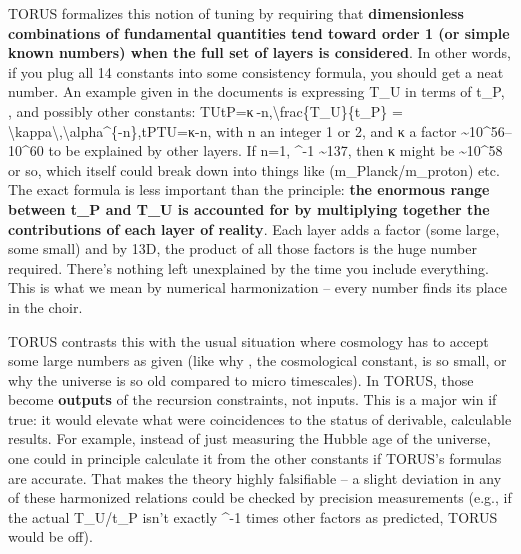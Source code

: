 \documentclass[
]{article}
\begin{document}
TORUS formalizes this notion of tuning by requiring that
\textbf{dimensionless combinations of fundamental quantities tend toward
order 1 (or simple known numbers) when the full set of layers is
considered}\hspace{0pt}. In other words, if you plug all 14 constants
into some consistency formula, you should get a neat number. An example
given in the documents is expressing
T_{U}{} in terms of
t_{P}, \alpha, and possibly
other constants: TUtP=κ \alpha-n,\textbackslash frac\{T\_U\}\{t\_P\} =
\textbackslash kappa\textbackslash,\textbackslash alpha\^{}\{-n\},tP\hspace{0pt}TU\hspace{0pt}\hspace{0pt}=κ\alpha-n,
with n an integer 1 or 2, and κ a factor
\textasciitilde10\^{}56--10\^{}60 to be explained by other
layers\hspace{0pt}. If n=1, \alpha\^{}-1 \textasciitilde137, then κ might be
\textasciitilde10\^{}58 or so, which itself could break down into things
like
(m_{Planck}/m_{proton})
etc. The exact formula is less important than the principle: \textbf{the
enormous range between
t_{P}{} and
T_{U}{} is accounted for
by multiplying together the contributions of each layer of
reality}\hspace{0pt}. Each layer adds a factor (some large, some small)
and by 13D, the product of all those factors is the huge number
required. There's nothing left unexplained by the time you include
everything. This is what we mean by numerical harmonization -- every
number finds its place in the choir.

TORUS contrasts this with the usual situation where cosmology has to
accept some large numbers as given (like why \Lambda, the cosmological
constant, is so small, or why the universe is so old compared to micro
timescales). In TORUS, those become \textbf{outputs} of the recursion
constraints, not inputs\hspace{0pt}. This is a major win if true: it
would elevate what were coincidences to the status of derivable,
calculable results\hspace{0pt}. For example, instead of just measuring
the Hubble age of the universe, one could in principle calculate it from
the other constants if TORUS's formulas are accurate. That makes the
theory highly falsifiable -- a slight deviation in any of these
harmonized relations could be checked by precision measurements (e.g.,
if the actual
T_{U}/t_{P}{}
isn't exactly \alpha\^{}-1 times other factors as predicted, TORUS would be
off).
\end{document}
